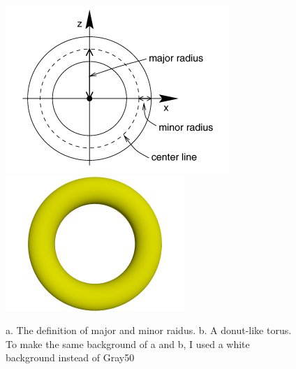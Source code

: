 \documentclass[fleqn,10pt]{wlscirep}
\begin{document}
\begin{figure}[htbp]
\centering
\includegraphics[width=20pc,clip]{FIG7a}
\includegraphics[width=16pc,clip]{FIG7b}
\caption{a. The definition of major and minor raidus. b. A donut-like torus. To make the same background of a and b, I used a white background instead of Gray50}
\label{fig:FIG7}
\end{figure}
\end{document}
